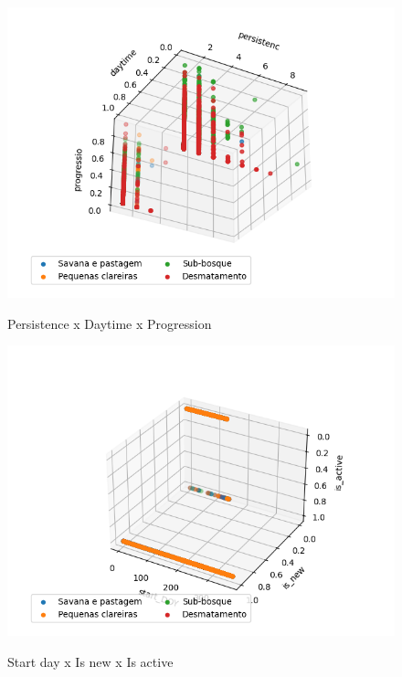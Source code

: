 \begin{multicols}{2}
\begin{figure}[H]
    \caption{Persistence x Daytime x Progression}
     
    \centering 
    \includegraphics[width=1.1\linewidth]{tg1/figuras/persistencxdaytimexprogressio--30--120.png}
    \label{figura:five}
\end{figure}

\begin{figure}[H]
    \caption{Start day x Is new x Is active}
     
    \centering 
    \includegraphics[width=01.1\linewidth]{tg1/figuras/start_DOYxis_newxis_active--150--120.png}
    \label{figura:six}
\end{figure}


\end{multicols}
